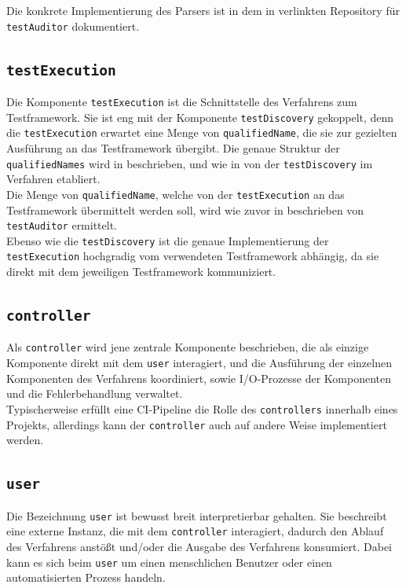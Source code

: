 Die konkrete Implementierung des Parsers ist in dem in  verlinkten Repository für \texttt{testAuditor} dokumentiert.

\subsection{\texttt{testExecution}}\label{Komponente_testExecution}
Die Komponente \texttt{testExecution} ist die Schnittstelle des Verfahrens zum Testframework. Sie ist eng mit der Komponente \texttt{testDiscovery} gekoppelt, denn die \texttt{testExecution} erwartet eine Menge von \texttt{qualifiedName}, die sie zur gezielten Ausführung an das Testframework übergibt. Die genaue Struktur der \texttt{qualifiedNames} wird in  beschrieben, und wie in  von der \texttt{testDiscovery} im Verfahren etabliert.\\
Die Menge von \texttt{qualifiedName}, welche von der \texttt{testExecution} an das Testframework übermittelt werden soll, wird wie zuvor in  beschrieben von \texttt{testAuditor} ermittelt.\\
Ebenso wie die \texttt{testDiscovery} ist die genaue Implementierung der \texttt{testExecution} hochgradig vom verwendeten Testframework abhängig, da sie direkt mit dem jeweiligen Testframework kommuniziert.

\subsection{\texttt{controller}}
Als \texttt{controller} wird jene zentrale Komponente beschrieben, die als einzige Komponente direkt mit dem \texttt{user} interagiert, und die Ausführung der einzelnen Komponenten des Verfahrens koordiniert, sowie I/O-Prozesse der Komponenten und die Fehlerbehandlung verwaltet.\\
Typischerweise erfüllt eine CI-Pipeline die Rolle des \texttt{controllers} innerhalb eines Projekts, allerdings kann der \texttt{controller} auch auf andere Weise implementiert werden.

\subsection{\texttt{user}}
Die Bezeichnung \texttt{user} ist bewusst breit interpretierbar gehalten. Sie beschreibt eine externe Instanz, die mit dem \texttt{controller} interagiert, dadurch den Ablauf des Verfahrens anstößt und/oder die Ausgabe des Verfahrens konsumiert. Dabei kann es sich beim \texttt{user} um einen menschlichen Benutzer oder einen automatisierten Prozess handeln. 
\newpage

